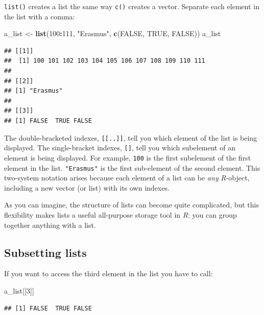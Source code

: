 \documentclass[
]{scrartcl}
\newenvironment{Shaded}{\begin{snugshade}}{\end{snugshade}}
\newcommand{\ConstantTok}[1]{\textcolor[rgb]{0.56,0.35,0.01}{#1}}
\newcommand{\DecValTok}[1]{\textcolor[rgb]{0.00,0.00,0.81}{#1}}
\newcommand{\FunctionTok}[1]{\textcolor[rgb]{0.13,0.29,0.53}{\textbf{#1}}}
\newcommand{\NormalTok}[1]{#1}
\newcommand{\OtherTok}[1]{\textcolor[rgb]{0.56,0.35,0.01}{#1}}
\newcommand{\SpecialCharTok}[1]{\textcolor[rgb]{0.81,0.36,0.00}{\textbf{#1}}}
\newcommand{\StringTok}[1]{\textcolor[rgb]{0.31,0.60,0.02}{#1}}
\begin{document}
\texttt{list()} creates a list the same way \texttt{c()} creates a vector. Separate each element in the list with a comma:

\begin{Shaded}
\begin{Highlighting}[]
\NormalTok{a\_list }\OtherTok{\textless{}{-}} \FunctionTok{list}\NormalTok{(}\DecValTok{100}\SpecialCharTok{:}\DecValTok{111}\NormalTok{, }\StringTok{"Erasmus"}\NormalTok{, }\FunctionTok{c}\NormalTok{(}\ConstantTok{FALSE}\NormalTok{, }\ConstantTok{TRUE}\NormalTok{, }\ConstantTok{FALSE}\NormalTok{))}
\NormalTok{a\_list}
\end{Highlighting}
\end{Shaded}

\begin{verbatim}
## [[1]]
##  [1] 100 101 102 103 104 105 106 107 108 109 110 111
## 
## [[2]]
## [1] "Erasmus"
## 
## [[3]]
## [1] FALSE  TRUE FALSE
\end{verbatim}

The double-bracketed indexes, \texttt{{[}{[}..{]}{]}}, tell you which element of the list is being displayed. The single-bracket indexes, \texttt{{[}{]}}, tell you which subelement of an element is being displayed. For example, \texttt{100} is the first subelement of the first element in the list. \texttt{"Erasmus"} is the first sub-element of the second element. This two-system notation arises because each element of a list can be \emph{any} \emph{R}-object, including a new vector (or list) with its own indexes.

As you can imagine, the structure of lists can become quite complicated, but this flexibility makes lists a useful all-purpose storage tool in \emph{R}: you can group together anything with a list.

\hypertarget{subsetting-lists}{%
\subsection{Subsetting lists}\label{subsetting-lists}}

If you want to access the third element in the list you have to call:

\begin{Shaded}
\begin{Highlighting}[]
\NormalTok{a\_list[[}\DecValTok{3}\NormalTok{]]}
\end{Highlighting}
\end{Shaded}

\begin{verbatim}
## [1] FALSE  TRUE FALSE
\end{verbatim}
\end{document}
